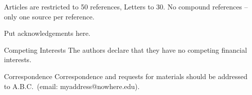 \documentclass{naturemod}
\begin{document}

\begin{thebibliography}{1}
 Articles are restricted to 50 references, Letters
to 30.
 No compound references -- only one source per
reference.
\end{thebibliography}



\begin{addendum}
 \item Put acknowledgements here.
 \item[Competing Interests] The authors declare that they have no
competing financial interests.
 \item[Correspondence] Correspondence and requests for materials
should be addressed to A.B.C.~(email: myaddress@nowhere.edu).
\end{addendum}

\end{document}
